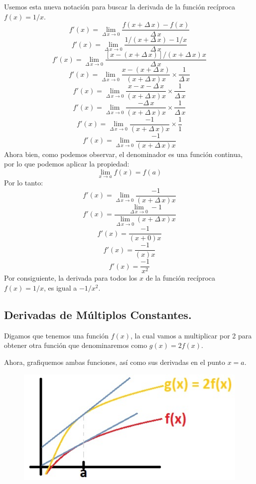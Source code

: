\documentclass[12pt]{article}
\begin{document}
Usemos esta nueva notación para buscar la derivada de la función recíproca $f(x) = 1/x$.
\[f'(x) = \lim_{\Delta \, x \to 0} \frac{f(x + \Delta \, x) - f(x)}{\Delta \, x}\]
\[f'(x) = \lim_{\Delta \, x \to 0} \frac{1/(x + \Delta \, x) - 1/x}{\Delta \, x}\]
\[f'(x) = \lim_{\Delta \, x \to 0} \frac{[x - (x + \Delta \, x)]/(x + \Delta \, x)x}{\Delta \, x}\]
\[f'(x) = \lim_{\Delta \, x \to 0} \frac{x - (x + \Delta \, x)}{(x + \Delta \, x)x} \times \frac{1}{\Delta \, x}\]
\[f'(x) = \lim_{\Delta \, x \to 0} \frac{x - x - \Delta \, x}{(x + \Delta \, x)x} \times \frac{1}{\Delta \, x}\]
\[f'(x) = \lim_{\Delta \, x \to 0} \frac{- \Delta \, x}{(x + \Delta \, x)x} \times \frac{1}{\Delta \, x}\]
\[f'(x) = \lim_{\Delta \, x \to 0} \frac{-1}{(x + \Delta \, x)x} \times \frac{1}{1}\]
\[f'(x) = \lim_{\Delta \, x \to 0} \frac{-1}{(x + \Delta \, x)x}\]
Ahora bien, como podemos observar, el denominador es una función continua, por lo que podemos aplicar la propiedad:
\[\lim_{x \to a} f(x) = f(a)\]
Por lo tanto:
\[f'(x) = \lim_{\Delta \, x \to 0} \frac{-1}{(x + \Delta \, x)x}\]
\[f'(x) = \frac{\lim_{\Delta \, x \to 0} -1}{\lim_{\Delta \, x \to 0} (x + \Delta \, x)x}\]
\[f'(x) = \frac{-1}{(x + 0)x}\]
\[f'(x) = \frac{-1}{(x)x}\]
\[f'(x) = \frac{-1}{x^{2}}\]
Por consiguiente, la derivada para todos los $x$ de la función recíproca $f(x) = 1/x$, es igual a $-1/x^{2}$.



\subsection{Derivadas de Múltiplos Constantes.}

Digamos que tenemos una función $f(x)$, la cual vamos a multiplicar por 2 para obtener otra función  que denominaremos como $g(x) = 2f(x)$.

Ahora, grafiquemos ambas funciones, así como sus derivadas en el punto $x = a$.

\begin{figure}[hbt!]
\centering
\includegraphics[scale=0.7]{img/deriv_const_mult.jpg}
\end{figure}
\end{document}
